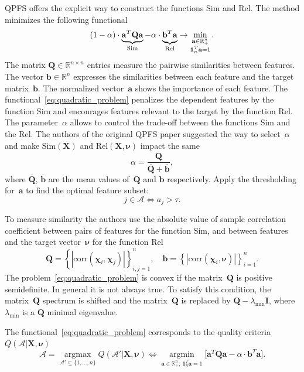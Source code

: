\documentclass[12pt,twoside]{article}
\newcommand{\ba}{\mathbf{a}}
\newcommand{\bb}{\mathbf{b}}
\newcommand{\bX}{\mathbf{X}}
\newcommand{\bQ}{\mathbf{Q}}
\newcommand{\bbR}{\mathbb{R}}
\newcommand{\cA}{\mathcal{A}}
\newcommand{\bchi}{\boldsymbol{\chi}}
\newcommand{\bnu}{\boldsymbol{\nu}}
\newcommand{\bOne}{\boldsymbol{1}}
\newcommand{\argmin}{\mathop{\arg \min}\limits}
\newcommand{\argmax}{\mathop{\arg \max}\limits}
\begin{document}
QPFS offers the explicit way to construct the functions Sim and Rel. 
The method minimizes the following functional
\begin{equation}
	(1 - \alpha) \cdot \underbrace{\ba^T \bQ \ba}_{\text{Sim}} - \alpha \cdot \underbrace{\vphantom{()} \mathbf{b}^T \ba}_{\text{Rel}} \rightarrow \min_{\substack{\ba \in \bbR^n_+ \\ \bOne_n^T \ba=1}}.
	\label{eq:quadratic_problem}
\end{equation}
The matrix $\bQ \in \bbR^{n \times n}$ entries measure the pairwise similarities between features. 
The vector $\mathbf{b} \in \bbR^n$ expresses the similarities between each feature and the target matrix~$\bb$.
The normalized vector~$\ba$ shows the importance of each feature. 
The functional~\eqref{eq:quadratic_problem} penalizes the dependent features by the function Sim and encourages features relevant to the target by the function Rel. 
The parameter~$\alpha$ allows to control the trade-off between the functions Sim and the Rel.
The authors of the original QPFS paper suggested the way to select~$\alpha$ and make $\text{Sim}(\bX)$ and $\text{Rel}(\bX, \bnu)$ impact the same
\begin{equation*}
	\alpha = \frac{\overline{\bQ}}{\overline{\bQ} + \overline{\bb}},
\end{equation*}
where $\overline{\bQ}$, $\overline{\bb}$ are the mean values of~$\bQ$ and $\bb$ respectively.
Apply the thresholding for~$\ba$ to find the optimal feature subset:
\[
	j \in \mathcal{A} \Leftrightarrow a_j > \tau.
\]

To measure similarity the authors use the absolute value of sample correlation coefficient between pairs of features for the function Sim, and between features and the target vector~$\bnu$ for the function Rel
\begin{equation}
	\bQ = \left\{\left|\text{corr}(\bchi_i, \bchi_j)\right|\right\}_{i,j=1}^n, \quad \bb = \left\{\left|\text{corr}(\bchi_i, \bnu)\right|\right\}_{i=1}^n.
	\label{eq:qpfs_1d_qb}
\end{equation}
The problem~\eqref{eq:quadratic_problem} is convex if the matrix~$\bQ$ is positive semidefinite. In general it is not always true. 
To satisfy this condition, the matrix~$\bQ$ spectrum is shifted and the matrix~$\bQ$ is replaced by $\bQ - \lambda_{\text{min}} \mathbf{I}$, where $\lambda_{\text{min}} $ is a $\bQ$ minimal eigenvalue.

The functional~\eqref{eq:quadratic_problem} corresponds to the quality criteria~$Q(\cA | \bX, \bnu)$
\begin{equation}
\cA = \argmax_{\cA' \subseteq \{1, \dots, n\}} Q(\cA' | \bX, \bnu) \Leftrightarrow \argmin_{\ba  \in \bbR^n_+, \, \bOne_n^T\ba=1} \bigl[\ba^T \bQ \ba - \alpha \cdot \mathbf{b}^T \ba \bigr].
\end{equation}
\end{document}
